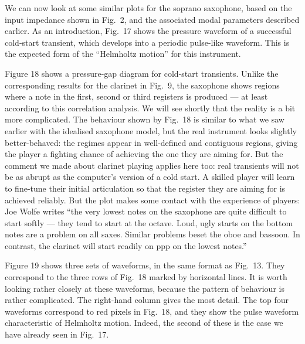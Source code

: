   We can now look at some similar plots for the soprano saxophone, based on the 
  input impedance shown in Fig.\ 2, and the associated modal parameters 
  described earlier. As an introduction, Fig.\ 17 shows the pressure waveform 
  of a successful cold-start transient, which develops into a periodic 
  pulse-like waveform. This is the expected form of the “Helmholtz motion” for 
  this instrument. 

  Figure 18 shows a pressure-gap diagram for cold-start transients. Unlike the 
  corresponding results for the clarinet in Fig.\ 9, the saxophone shows 
  regions where a note in the first, second or third registers is produced — at 
  least according to this correlation analysis. We will see shortly that the 
  reality is a bit more complicated. The behaviour shown by Fig.\ 18 is similar 
  to what we saw earlier with the idealised saxophone model, but the real 
  instrument looks slightly better-behaved: the regimes appear in well-defined 
  and contiguous regions, giving the player a fighting chance of achieving the 
  one they are aiming for. But the comment we made about clarinet playing 
  applies here too: real transients will not be as abrupt as the computer’s 
  version of a cold start. A skilled player will learn to fine-tune their 
  initial articulation so that the register they are aiming for is achieved 
  reliably. But the plot makes some contact with the experience of players: Joe 
  Wolfe writes ``the very lowest notes on the saxophone are quite difficult to 
  start softly --- they tend to start at the octave. Loud, ugly starts on the 
  bottom notes are a problem on all saxes. Similar problems beset the oboe and 
  bassoon. In contrast, the clarinet will start readily on ppp on the lowest 
  notes.'' 


  Figure 19 shows three sets of waveforms, in the same format as Fig.\ 13. They 
  correspond to the three rows of Fig.\ 18 marked by horizontal lines. It is 
  worth looking rather closely at these waveforms, because the pattern of 
  behaviour is rather complicated. The right-hand column gives the most detail. 
  The top four waveforms correspond to red pixels in Fig.\ 18, and they show 
  the pulse waveform characteristic of Helmholtz motion. Indeed, the second of 
  these is the case we have already seen in Fig.\ 17. 

